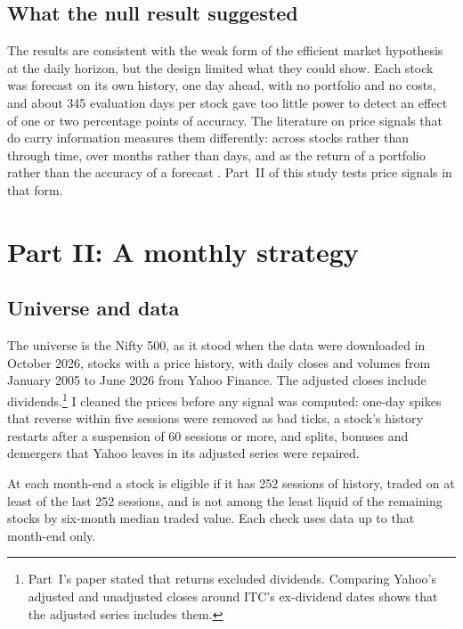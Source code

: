 \documentclass[11pt]{article}
\begin{document}
\subsection{What the null result suggested}

The results are consistent with the weak form of the efficient market hypothesis
\citep{fama1970} at the daily horizon, but the design limited what they could show.
Each stock was forecast on its own history, one day ahead, with no portfolio and no
costs, and about 345 evaluation days per stock gave too little power to detect an
effect of one or two percentage points of accuracy. The literature on price signals
that do carry information measures them differently: across stocks rather than
through time, over months rather than days, and as the return of a portfolio rather
than the accuracy of a forecast \citep{jegadeesh1993}. Part~II of this study tests price signals
in that form.

\section{Part II: A monthly strategy}\label{sec:parttwo}

\subsection{Universe and data}

The universe is the Nifty 500, as it stood when the data were downloaded in October
2026, \NSurvivorUniverse{} stocks with a price history, with daily closes and volumes
from January 2005 to June 2026 from Yahoo Finance. The adjusted closes include
dividends.\footnote{Part~I's paper stated that returns excluded dividends. Comparing
Yahoo's adjusted and unadjusted closes around ITC's ex-dividend dates shows that the
adjusted series includes them.} I cleaned the prices before any signal was computed:
one-day spikes that reverse within five sessions were removed as bad ticks, a
stock's history restarts after a suspension of 60 sessions or more, and splits,
bonuses and demergers that Yahoo leaves in its adjusted series were repaired.

At each month-end a stock is eligible if it has 252 sessions of history, traded on
at least \MinTradedPct{} of the last 252 sessions, and is not among the least liquid
\LiqDropPct{} of the remaining stocks by six-month median traded value. Each check
uses data up to that month-end only.
\end{document}
